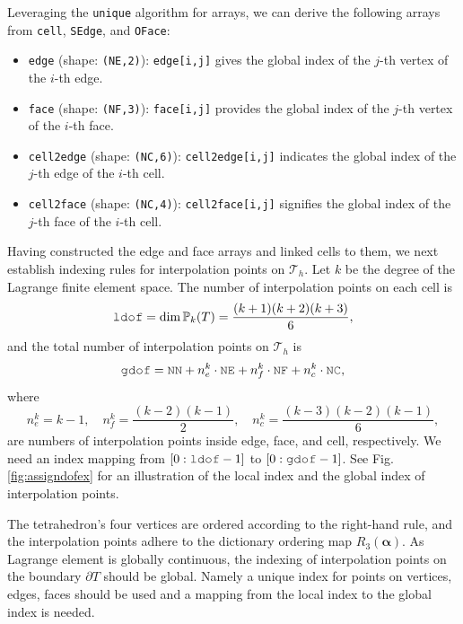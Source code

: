 \documentclass[mathpazo]{cicp}
\begin{document}
Leveraging the \lstinline{unique} algorithm for arrays, we can derive the
following arrays from \lstinline{cell}, \lstinline{SEdge}, and
\lstinline{OFace}:
\begin{itemize}
  \item \lstinline{edge} (shape: \lstinline{(NE,2)}): \lstinline{edge[i,j]} gives the global index of the $j$-th vertex of the $i$-th edge.
  \item \lstinline{face} (shape: \lstinline{(NF,3)}): \lstinline{face[i,j]} provides the global index of the $j$-th vertex of the $i$-th face.
  \item \lstinline{cell2edge} (shape: \lstinline{(NC,6)}): \lstinline{cell2edge[i,j]} indicates the global index of the $j$-th edge of the $i$-th cell.
  \item \lstinline{cell2face} (shape: \lstinline{(NC,4)}): \lstinline{cell2face[i,j]} signifies the global index of the $j$-th face of the $i$-th cell.
\end{itemize}

Having constructed the edge and face arrays and linked cells to them, we next
establish indexing rules for interpolation points on \(\mathcal T_h\). Let \(k\)
be the degree of the Lagrange finite element space. The number of interpolation
points on each cell is
\[
\mc{ldof} = \dim \mathbb P_k(T) = \frac{(k+1)(k+2)(k+3)}{6},
\]
and the total number of interpolation points on \(\mathcal T_h\) is
\[
\mc{gdof} = \mc{NN} + n_e^k \cdot \mc{NE} + n_f^k \cdot \mc{NF} + n_c^k \cdot \mc{NC},
\]
where
\[
n_e^k = k-1, \quad n_f^k = \frac{(k-2)(k-1)}{2}, \quad n_c^k =
\frac{(k-3)(k-2)(k-1)}{6},
\]
are numbers of interpolation points inside edge, face, and cell, respectively. We need an index mapping from $[0: \mc{ldof}-1]$ to  $[0: \mc{gdof}-1]$. 
See Fig. \ref{fig:assigndofex} for an illustration of the local index and the global index of interpolation points. 



The tetrahedron's four vertices are ordered
according to the right-hand rule, and the interpolation points adhere to the
dictionary ordering map \(R_3(\boldsymbol \alpha)\). As Lagrange
element is globally continuous, the indexing of interpolation points on the boundary $\partial T$ should be global. Namely a unique index for points on vertices, 
edges, faces should be used and a mapping from the local index to the global index is needed. 
\end{document}

